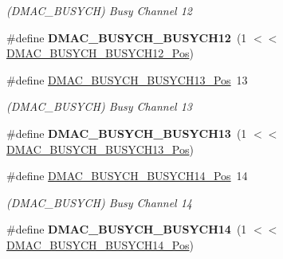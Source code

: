 \begin{DoxyCompactItemize}
\begin{DoxyCompactList}\small\item\em (D\+M\+A\+C\+\_\+\+B\+U\+S\+Y\+C\+H) Busy Channel 12 \end{DoxyCompactList}\item 
\hypertarget{group___s_a_m_l21___d_m_a_c_gad8117de4c5d8b04a87965e157e8e6571}{}\#define {\bfseries D\+M\+A\+C\+\_\+\+B\+U\+S\+Y\+C\+H\+\_\+\+B\+U\+S\+Y\+C\+H12}~(1 $<$$<$ \hyperlink{group___s_a_m_l21___d_m_a_c_ga10e544cbddcba33a11edf591088f949e}{D\+M\+A\+C\+\_\+\+B\+U\+S\+Y\+C\+H\+\_\+\+B\+U\+S\+Y\+C\+H12\+\_\+\+Pos})\label{group___s_a_m_l21___d_m_a_c_gad8117de4c5d8b04a87965e157e8e6571}

\item 
\hypertarget{group___s_a_m_l21___d_m_a_c_gaa16377a7cd68099b858e3fae17ff0e3e}{}\#define \hyperlink{group___s_a_m_l21___d_m_a_c_gaa16377a7cd68099b858e3fae17ff0e3e}{D\+M\+A\+C\+\_\+\+B\+U\+S\+Y\+C\+H\+\_\+\+B\+U\+S\+Y\+C\+H13\+\_\+\+Pos}~13\label{group___s_a_m_l21___d_m_a_c_gaa16377a7cd68099b858e3fae17ff0e3e}

\begin{DoxyCompactList}\small\item\em (D\+M\+A\+C\+\_\+\+B\+U\+S\+Y\+C\+H) Busy Channel 13 \end{DoxyCompactList}\item 
\hypertarget{group___s_a_m_l21___d_m_a_c_ga241b8949ef279ad819337c5b6ad8ca78}{}\#define {\bfseries D\+M\+A\+C\+\_\+\+B\+U\+S\+Y\+C\+H\+\_\+\+B\+U\+S\+Y\+C\+H13}~(1 $<$$<$ \hyperlink{group___s_a_m_l21___d_m_a_c_gaa16377a7cd68099b858e3fae17ff0e3e}{D\+M\+A\+C\+\_\+\+B\+U\+S\+Y\+C\+H\+\_\+\+B\+U\+S\+Y\+C\+H13\+\_\+\+Pos})\label{group___s_a_m_l21___d_m_a_c_ga241b8949ef279ad819337c5b6ad8ca78}

\item 
\hypertarget{group___s_a_m_l21___d_m_a_c_ga4141b4d55191df50b5c711249eeb4fea}{}\#define \hyperlink{group___s_a_m_l21___d_m_a_c_ga4141b4d55191df50b5c711249eeb4fea}{D\+M\+A\+C\+\_\+\+B\+U\+S\+Y\+C\+H\+\_\+\+B\+U\+S\+Y\+C\+H14\+\_\+\+Pos}~14\label{group___s_a_m_l21___d_m_a_c_ga4141b4d55191df50b5c711249eeb4fea}

\begin{DoxyCompactList}\small\item\em (D\+M\+A\+C\+\_\+\+B\+U\+S\+Y\+C\+H) Busy Channel 14 \end{DoxyCompactList}\item 
\hypertarget{group___s_a_m_l21___d_m_a_c_ga7be4add23e6ec5d92c7756f8b44a1ac7}{}\#define {\bfseries D\+M\+A\+C\+\_\+\+B\+U\+S\+Y\+C\+H\+\_\+\+B\+U\+S\+Y\+C\+H14}~(1 $<$$<$ \hyperlink{group___s_a_m_l21___d_m_a_c_ga4141b4d55191df50b5c711249eeb4fea}{D\+M\+A\+C\+\_\+\+B\+U\+S\+Y\+C\+H\+\_\+\+B\+U\+S\+Y\+C\+H14\+\_\+\+Pos})\label{group___s_a_m_l21___d_m_a_c_ga7be4add23e6ec5d92c7756f8b44a1ac7}


\end{DoxyCompactItemize}
